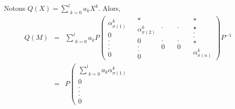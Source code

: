Notons $Q (X) = \underset{k = 0}{\overset{l}{\sum}} a_k X^k$. Alors,
\begin{eqnarray*}
  Q (M) & = & \underset{k = 0}{\overset{l}{\sum}} a_k P \left(
  \begin{array}{c}
    \alpha^k_{\sigma (1)}\\
    0\\
    .\\
    .\\
    .\\
    0
  \end{array} \begin{array}{c}
    \\
    
  \end{array} \begin{array}{c}
    \ast\\
    \alpha^k_{\sigma (2)}\\
    0\\
    .\\
    .\\
    0
  \end{array}  \begin{array}{c}
    .\\
    \\
    \\
    \\
    .\\
    0
  \end{array} \quad \begin{array}{c}
    .\\
    \\
    \\
    \\
    .\\
    0
  \end{array} \quad \begin{array}{l}
    \ast\\
    \star\\
    .\\
    .\\
    \ast\\
    \alpha^k_{\sigma (n)}
  \end{array} \right) P^{- 1}\\
  & = & P \left( \begin{array}{c}
    \underset{k = 0}{\overset{l}{\sum}} a_k \alpha^k_{\sigma (1)}\\
    0\\
    .\\
    .\\
    .\\
    0
  \end{array} \begin{array}{c}
    \\
    

\end{array}
\end{eqnarray*}
